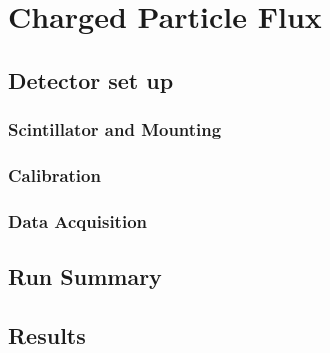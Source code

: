 \section{Charged Particle Flux} %
\label{sec:charged_particle_flux}
\subsection{Detector set up} %
\label{sub:flux_flux_detector_set_up}
\subsubsection{Scintillator and Mounting} %
\label{ssub:flux_scintillator_mounting}

\subsubsection{Calibration} %
\label{ssub:flux_calibration}

\subsubsection{Data Acquisition} %
\label{ssub:flux_data_acquisition}

\subsection{Run Summary} %
\label{sub:flux_run_summary}

\subsection{Results} %
\label{sub:flux_results}

